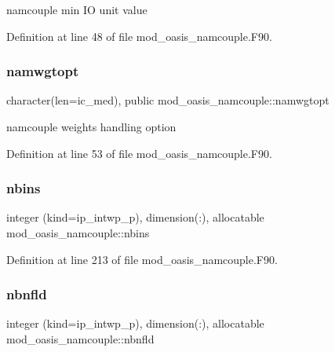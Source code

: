 namcouple min IO unit value 



Definition at line 48 of file mod\+\_\+oasis\+\_\+namcouple.\+F90.

\mbox{\label{namespacemod__oasis__namcouple_a03a63fe10e98e695e556ee190cd3accc}} 
\subsubsection{\texorpdfstring{namwgtopt}{namwgtopt}}
{\footnotesize\ttfamily character(len=ic\+\_\+med), public mod\+\_\+oasis\+\_\+namcouple\+::namwgtopt}



namcouple weights handling option 



Definition at line 53 of file mod\+\_\+oasis\+\_\+namcouple.\+F90.

\mbox{\label{namespacemod__oasis__namcouple_a4c609c48a20205e1d2aa9938d7babc92}} 
\subsubsection{\texorpdfstring{nbins}{nbins}}
{\footnotesize\ttfamily integer (kind=ip\+\_\+intwp\+\_\+p), dimension(\+:), allocatable mod\+\_\+oasis\+\_\+namcouple\+::nbins\hspace{0.3cm}{\ttfamily [private]}}



Definition at line 213 of file mod\+\_\+oasis\+\_\+namcouple.\+F90.

\mbox{\label{namespacemod__oasis__namcouple_af0c7b1e7e49159c6b9c0dc3663264346}} 
\subsubsection{\texorpdfstring{nbnfld}{nbnfld}}
{\footnotesize\ttfamily integer (kind=ip\+\_\+intwp\+\_\+p), dimension(\+:), allocatable mod\+\_\+oasis\+\_\+namcouple\+::nbnfld\hspace{0.3cm}{\ttfamily [private]}}



